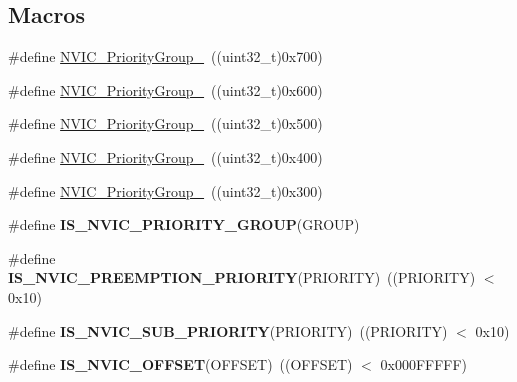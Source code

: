 \subsection*{Macros}
\begin{DoxyCompactItemize}
\item 
\#define \hyperlink{group___m_i_s_c___preemption___priority___group_gaeac0cf537f65d17bc19aee2410b2b60e}{N\+V\+I\+C\+\_\+\+Priority\+Group\+\_}~((uint32\+\_\+t)0x700)
\item 
\#define \hyperlink{group___m_i_s_c___preemption___priority___group_ga89bf0bf9e70f1a372a541b1b8d7493aa}{N\+V\+I\+C\+\_\+\+Priority\+Group\+\_}~((uint32\+\_\+t)0x600)
\item 
\#define \hyperlink{group___m_i_s_c___preemption___priority___group_ga505002e8b76aef65499ca371e40ec8b4}{N\+V\+I\+C\+\_\+\+Priority\+Group\+\_}~((uint32\+\_\+t)0x500)
\item 
\#define \hyperlink{group___m_i_s_c___preemption___priority___group_ga49bdbee77d4a70339d63c80462d49b4d}{N\+V\+I\+C\+\_\+\+Priority\+Group\+\_}~((uint32\+\_\+t)0x400)
\item 
\#define \hyperlink{group___m_i_s_c___preemption___priority___group_gaf9020c585da2a299328f0b06dee391a2}{N\+V\+I\+C\+\_\+\+Priority\+Group\+\_}~((uint32\+\_\+t)0x300)
\item 
\#define {\bfseries I\+S\+\_\+\+N\+V\+I\+C\+\_\+\+P\+R\+I\+O\+R\+I\+T\+Y\+\_\+\+G\+R\+O\+UP}(G\+R\+O\+UP)
\item 
\mbox{\label{group___m_i_s_c___preemption___priority___group_gaf30fd8f5960c2e28a772d8f16bb156dd}} 
\#define {\bfseries I\+S\+\_\+\+N\+V\+I\+C\+\_\+\+P\+R\+E\+E\+M\+P\+T\+I\+O\+N\+\_\+\+P\+R\+I\+O\+R\+I\+TY}(P\+R\+I\+O\+R\+I\+TY)~((P\+R\+I\+O\+R\+I\+TY) $<$ 0x10)
\item 
\mbox{\label{group___m_i_s_c___preemption___priority___group_ga010705bc997dcff935b965b372cba61d}} 
\#define {\bfseries I\+S\+\_\+\+N\+V\+I\+C\+\_\+\+S\+U\+B\+\_\+\+P\+R\+I\+O\+R\+I\+TY}(P\+R\+I\+O\+R\+I\+TY)~((P\+R\+I\+O\+R\+I\+TY) $<$ 0x10)
\item 
\mbox{\label{group___m_i_s_c___preemption___priority___group_ga1184bbb97d758385f98ab40dd5e5af59}} 
\#define {\bfseries I\+S\+\_\+\+N\+V\+I\+C\+\_\+\+O\+F\+F\+S\+ET}(O\+F\+F\+S\+ET)~((O\+F\+F\+S\+ET) $<$ 0x000\+F\+F\+F\+F\+F)
\end{DoxyCompactItemize}


